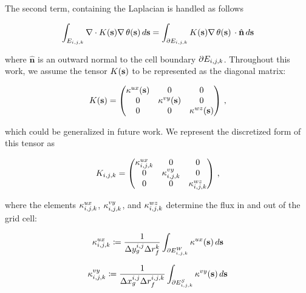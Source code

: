 The second term, containing the Laplacian is handled as follows
\begin{linenomath*}\begin{equation*}
    \int_{E_{i,j,k}} \nabla\cdot K(\mathbf{s})\nabla\,\theta(\mathbf{s})\,d\mathbf{s}
    =\int_{\partial E_{i,j,k}} K(\mathbf{s})\nabla\,\theta(\mathbf{s})\,
    \cdot \hat{\mathbf{n}} \, d\mathbf{s}
\end{equation*}\end{linenomath*}
where $\hat{\mathbf{n}}$ is an outward normal to the cell boundary
$\partial E_{i,j,k}$.
Throughout this work, we assume the tensor $K(\mathbf{s})$ to be represented as the
diagonal matrix:
\begin{linenomath*}\begin{equation*}
    K(\mathbf{s}) =
    \begin{pmatrix}
        \kappa^{ux}(\mathbf{s}) & 0 & 0 \\
        0 &\kappa^{vy}(\mathbf{s}) & 0 \\
        0 & 0 & \kappa^{wz}(\mathbf{s}) \\
    \end{pmatrix} \, ,
\end{equation*}\end{linenomath*}
which could be generalized in future work.
We represent the discretized form of this tensor as
\begin{linenomath*}\begin{equation*}
    K_{i,j,k} =
    \begin{pmatrix}
        \kappa^{ux}_{i,j,k} & 0 & 0 \\
        0 & \kappa^{vy}_{i,j,k} & 0 \\
        0 & 0 & \kappa^{wz}_{i,j,k} \\
    \end{pmatrix} \, ,
\end{equation*}\end{linenomath*}
where the elements $\kappa^{ux}_{i,j,k}$, $\kappa^{vy}_{i,j,k}$, and $\kappa^{wz}_{i,j,k}$
determine the flux in and out of the grid cell:
\begin{linenomath*}\begin{equation*}
    \kappa^{ux}_{{i,j,k}} \coloneqq \dfrac{1}{\Delta y_g^{i,j}\Delta r_f^{k}}
    \int_{\partial E_{{i,j,k}}^{W}} \kappa^{ux}(\mathbf{s})\,d\mathbf{s}
\end{equation*}\end{linenomath*}
\begin{linenomath*}\begin{equation*}
    \kappa^{vy}_{{i,j,k}} \coloneqq \dfrac{1}{\Delta x_g^{i,j}\Delta r_f^{{i,j,k}}}
    \int_{\partial E_{{i,j,k}}^{S}} \kappa^{vy}(\mathbf{s})\,d\mathbf{s}
\end{equation*}\end{linenomath*}
